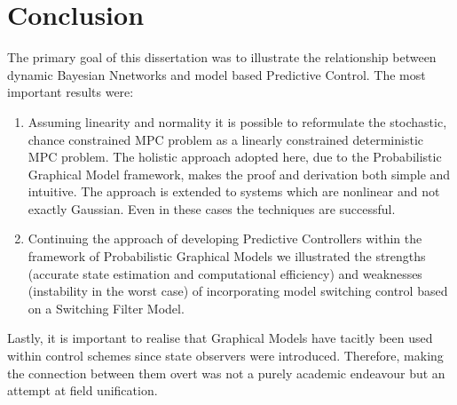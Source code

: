 \section{Conclusion}
The primary goal of this dissertation was to illustrate the relationship between dynamic Bayesian Nnetworks and model based Predictive Control. The most important results were:
\begin{enumerate}
\item
Assuming linearity and normality it is possible to reformulate the stochastic, chance constrained MPC problem as a linearly constrained deterministic MPC problem. The holistic approach adopted here, due to the Probabilistic Graphical Model framework, makes the proof and derivation both simple and intuitive. The approach is extended to systems which are nonlinear and not exactly Gaussian. Even in these cases the techniques are successful.
\item
Continuing the approach of developing Predictive Controllers within the framework of Probabilistic Graphical Models we illustrated the strengths (accurate state estimation and computational efficiency) and weaknesses (instability in the worst case) of incorporating model switching control based on a Switching Filter Model.
\end{enumerate} 
Lastly, it is important to realise that Graphical Models have tacitly been used within control schemes since state observers were introduced. Therefore, making the connection between them overt was not a purely academic endeavour but an attempt at field unification.